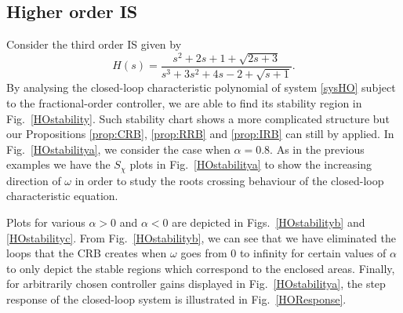 \documentclass[twoside,reqno,11pt]{fcaa-var} %
\begin{document}
\subsection{Higher order IS}
Consider the third order IS given by
\begin{equation}
H(s)=\frac{s^2+2s+1+\sqrt{2s+3}}{s^3+3s^2+4s-2+\sqrt{s+1}}. \label{sysHO}
\end{equation}
By analysing the closed-loop characteristic polynomial of system \eqref{sysHO} subject to the fractional-order controller, we are able to find its stability region in Fig.~\ref{HOstability}. Such stability chart shows a more complicated structure but our Propositions \ref{prop:CRB}, \ref{prop:RRB} and \ref{prop:IRB} can still by applied. In Fig.~\ref{HOstabilitya}, we consider the case when $\alpha=0.8$. As in the previous examples we have the $S_\chi$ plots in Fig.~\ref{HOstabilitya} to show the increasing direction of $\omega$ in order to study the roots crossing behaviour of the closed-loop characteristic equation.\par 
Plots for various $\alpha>0$ and $\alpha<0$ are depicted in Figs.~\ref{HOstabilityb} and \ref{HOstabilityc}. From Fig.~\ref{HOstabilityb}, we can see that we have eliminated the loops that the CRB creates when $\omega$ goes from 0 to infinity for certain values of $\alpha$ to only depict the stable regions which correspond to the enclosed areas.
Finally, for arbitrarily chosen controller gains displayed in Fig.~\ref{HOstabilitya}, the step response of the closed-loop system is illustrated in Fig.~\ref{HOResponse}.
\end{document}
